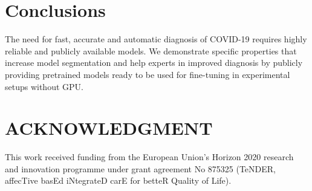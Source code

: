 \documentclass{elsarticle}
\begin{document}
\section{Conclusions}\label{sec:conclusions}
The need for fast, accurate and automatic diagnosis of COVID-19 requires highly reliable and publicly available models.
We demonstrate specific properties that increase model segmentation and help experts in improved diagnosis by publicly providing pretrained models ready to be used for fine-tuning in experimental setups without GPU\@.

\section*{ACKNOWLEDGMENT}
This work received funding from the European Union’s Horizon 2020 research and innovation programme under grant agreement No 875325 (TeNDER, affecTive basEd iNtegrateD carE for betteR Quality of Life).



\end{document}
